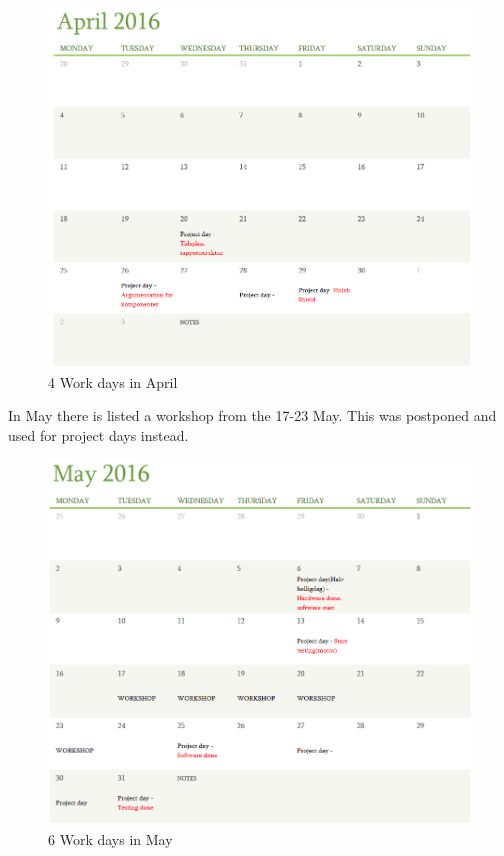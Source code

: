 \begin{figure}[h!]
  \centering
  \includegraphics[width=1.1\textwidth]{figures/april.png}
  
  \caption{4 Work days in April}
  \label{Time Schedule}
\end{figure}

In May there is listed a workshop from the 17-23 May. This was postponed and used for project days instead.
\begin{figure}[h!]
  \centering
  \includegraphics[width=1.1\textwidth]{figures/may.png}
  
  \caption{6 Work days in May}
  \label{Time Schedule}
\end{figure}

